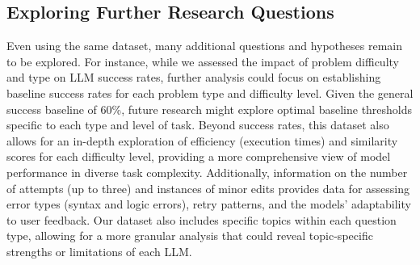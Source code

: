 \documentclass[conference]{IEEEtran}
\begin{document}
\subsection{Exploring Further Research Questions}
Even using the same dataset, many additional questions and hypotheses remain to be explored. For instance, while we assessed the impact of problem difficulty and type on LLM success rates, further analysis could focus on establishing baseline success rates for each problem type and difficulty level.  Given the general success baseline of 60\%, future research might explore optimal baseline thresholds specific to each type and level of task.
Beyond success rates, this dataset also allows for an in-depth exploration of efficiency (execution times) and similarity scores for each difficulty level, providing a more comprehensive view of model performance in diverse task complexity. Additionally, information on the number of attempts (up to three) and instances of minor edits provides data for assessing error types (syntax and logic errors), retry patterns, and the models' adaptability to user feedback. Our dataset also includes specific topics within each question type, allowing for a more granular analysis that could reveal topic-specific strengths or limitations of each LLM. 








\end{document}
